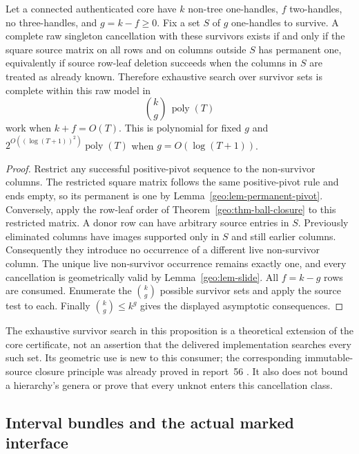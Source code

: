 \begin{proposition}
\label{geo:prop-fixed-genus}
Let a connected authenticated core have $k$ non-tree one-handles, $f$
two-handles, no three-handles, and $g=k-f\ge0$.  Fix a set $S$ of $g$
one-handles to survive.  A complete raw singleton cancellation with these
survivors exists if and only if the square source matrix on all rows and
on columns outside $S$ has permanent one, equivalently if source row-leaf
deletion succeeds when the columns in $S$ are treated as already known.
Therefore exhaustive search over survivor sets is complete within this
raw model in
\[
 \binom{k}{g}\,\operatorname{poly}(T)
 \tag{G5}\label{geo:eq-genus-search}
\]
work when $k+f=O(T)$.  This is polynomial for fixed $g$ and
$2^{O((\log(T+1))^2)}\operatorname{poly}(T)$ when $g=O(\log(T+1))$.
\end{proposition}

\begin{proof}
Restrict any successful positive-pivot sequence to the non-survivor
columns.  The restricted square matrix follows the same positive-pivot
rule and ends empty, so its permanent is one by
Lemma~\ref{geo:lem-permanent-pivot}.  Conversely, apply the row-leaf order
of Theorem~\ref{geo:thm-ball-closure} to this restricted matrix.  A donor
row can have arbitrary source entries in $S$.  Previously eliminated
columns have images supported only in $S$ and still earlier columns.
Consequently they introduce no occurrence of a different live
non-survivor column.  The unique live non-survivor occurrence remains
exactly one, and every cancellation is geometrically valid by
Lemma~\ref{geo:lem-slide}.  All $f=k-g$ rows are consumed.  Enumerate the
$\binom{k}{g}$ possible survivor sets and apply the source test to each.
Finally $\binom{k}{g}\le k^g$ gives the displayed asymptotic consequences.
\end{proof}

The exhaustive survivor search in this proposition is a theoretical
extension of the core certificate, not an assertion that the delivered
implementation searches every such set.  Its geometric use is new to this
consumer; the corresponding immutable-source closure principle was
already proved in report~56 \cite{ProveIt2026}.  It also does not bound a
hierarchy's genera or prove that every unknot enters this cancellation
class.

\subsection{Interval bundles and the actual marked interface}
\label{geo:bundles}

